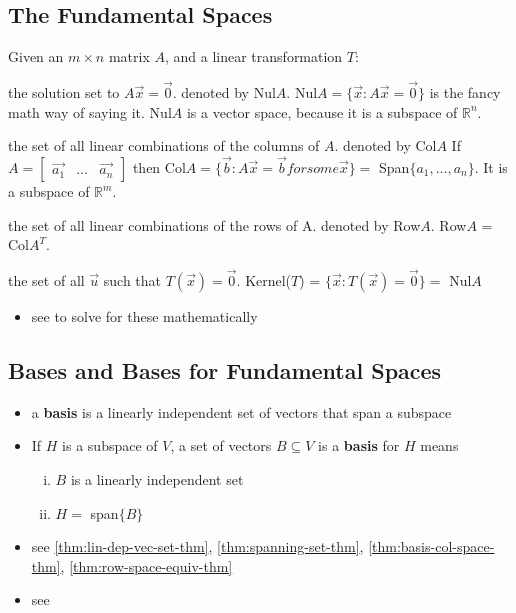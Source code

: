 \documentclass[a4paper,12pt]{article}
\theoremstyle{definition}
\theoremstyle{definition}
\newcommand{\mateq}[3]{#1#2 = #3}
\newcommand{\mateqaxb}{\mateq{A}{\vec{x}}{\vec{b}}}
\newcommand{\mateqaxo}{\mateq{A}{\vec{x}}{\vec{0}}}
\newcommand{\finitevecs}[2]{#1_1,\ldots,#1_#2}
\newcommand{\finitevecsset}[2]{\{\finitevecs{#1}{#2}\}}
\begin{document}
	\subsection{The Fundamental Spaces}
	Given an $m \times n$ matrix $A$, and a linear transformation $T$:
	\begin{description}[style=nextline]
		\item[null space] the solution set to $\mateqaxo$. denoted by Nul$A$. Nul$A = \{\vec{x}: \mateqaxo\}$ is the fancy math way of saying it. Nul$A$ is a vector space, because it is a subspace of $\mathbb{R}^n$.
		
		\item[column space] the set of all linear combinations of the columns of $A$. denoted by Col$A$ If $A =
		\begin{bmatrix}
			\vec{a_1} & \ldots & \vec{a_n}
		\end{bmatrix}$
		then Col$A = \{\vec{b} : \mateqaxb for some \vec{x}\} =$ Span$\finitevecsset{a}{n}$. It is a subspace of $\mathbb{R}^m$.
		
		\item[row space] the set of all linear combinations of the rows of A. denoted by Row$A$. Row$A$ = Col$A^T$.
		
		\item[kernel] the set of all $\vec{u}$ such that $\mateq{T}{(\vec{x})}{\vec{0}}$. Kernel($T$) = $\{\vec{x}: T(\vec{x}) = \vec{0}\} =$ Nul$A$
	\end{description}
	
	\begin{itemize}
		\item see  to solve for these mathematically
	\end{itemize}
	
	\subsection{Bases and Bases for Fundamental Spaces}
	\begin{itemize}
		\item a \textbf{basis} is a linearly independent set of vectors that span a subspace
		
		\item If $H$ is a subspace of $V$, a set of vectors $B \subseteq V$ is a \textbf{basis} for $H$ means
		\begin{enumerate}[i.]
			\item $B$ is a linearly independent set
			\item $H =$ span$\{B\}$
		\end{enumerate}
		
		\item see \autoref{thm:lin-dep-vec-set-thm}, \autoref{thm:spanning-set-thm}, \autoref{thm:basis-col-space-thm},
		\autoref{thm:row-space-equiv-thm}
		
		\item see 
	\end{itemize}
	
\end{document}
